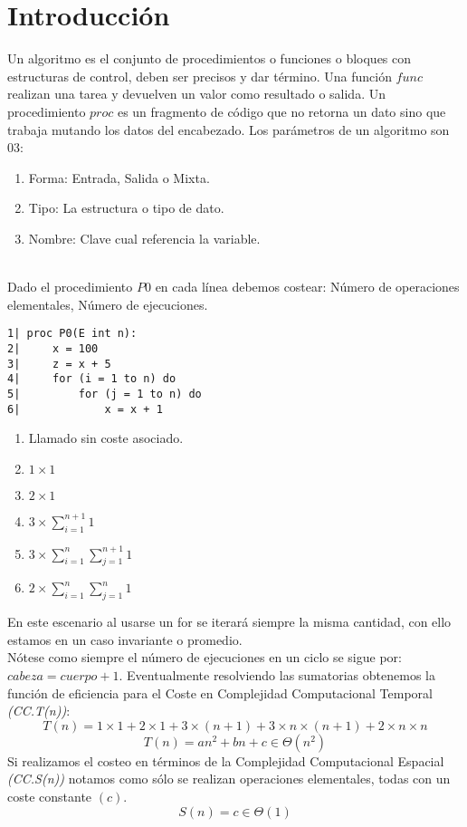 \documentclass[tikz,11pt,fleqn]{book} %
\begin{document}
\section{Introducción}
Un algoritmo es el conjunto de procedimientos o funciones o bloques con estructuras de control, deben ser precisos y dar término.
Una función $func$ realizan una tarea y devuelven un valor como resultado o salida.
Un procedimiento $proc$ es un fragmento de código que no retorna un dato sino que trabaja mutando los datos del encabezado.
Los parámetros de un algoritmo son 03:
\begin{enumerate}
	\item Forma: Entrada, Salida o Mixta.
	\item Tipo: La estructura o tipo de dato.
	\item Nombre: Clave cual referencia la variable.
\end{enumerate}
\begin{example}~
	\\

	Dado el procedimiento $P0$ en cada línea debemos costear: Número de operaciones elementales, Número de ejecuciones.
	\begin{multicols}{2}
		\begin{lstlisting}
1| proc P0(E int n):
2|     x = 100
3|     z = x + 5
4|     for (i = 1 to n) do
5|         for (j = 1 to n) do
6|             x = x + 1
        \end{lstlisting}
		\columnbreak
		\begin{enumerate}
			\item Llamado sin coste asociado.
			\item $1\times1$
			\item $2\times1$
			\item $3\times\sum_{i=1}^{n+1}1$
			\item $3\times\sum_{i=1}^{n}\sum_{j=1}^{n+1}1$
			\item $2\times\sum_{i=1}^{n}\sum_{j=1}^{n}1$
		\end{enumerate}
	\end{multicols}
	En este escenario al usarse un for se iterará siempre la misma cantidad, con ello estamos en un caso invariante o promedio.
	\\Nótese como siempre el número de ejecuciones en un ciclo se sigue por: $cabeza=cuerpo+1$.
	Eventualmente resolviendo las sumatorias obtenemos la función de eficiencia para el Coste en Complejidad Computacional Temporal \textit{(CC.T(n))}:
	$$
		T(n)=1\times1+2\times1+3\times(n+1)+3\times n\times(n+1)+2\times n\times n
	$$ $$
		T(n)=an^2+bn+c\in \Theta(n^2)
	$$
	Si realizamos el costeo en términos de la Complejidad Computacional Espacial \textit{(CC.S(n))} notamos como sólo se realizan operaciones elementales, todas con un coste constante $(c)$.
	$$
		S(n)=c\in\Theta(1)
	$$
\end{example}
\end{document}
